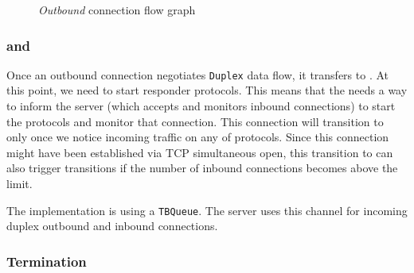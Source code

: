\begin{figure}[p]
{}
  \caption{\textit{Outbound} connection flow graph}
  \label{fig:outbound_flow}
\end{figure}

\subsubsection{\OutboundStateDup{} and \DuplexState{}}
Once an outbound connection negotiates \texttt{Duplex} data flow, it transfers
to \OutboundStateDup{}.  At this point, we need to start responder protocols.
This means that the \connmngr{} needs a way to inform the server (which
accepts and monitors inbound connections) to start the protocols and monitor
that connection.  This connection will transition to \DuplexState{} only once
we notice incoming traffic on any of \established{} protocols. Since this connection might
have been established via TCP simultaneous open, this transition to \DuplexState{} can
also trigger \Prune{} transitions if the number of inbound connections becomes above
the limit.

\begin{detail}
  The implementation is using a \texttt{TBQueue}. The server uses this channel
  for incoming duplex outbound and inbound connections.
\end{detail}

\subsubsection{Termination}\label{sec:outbound_termination}

